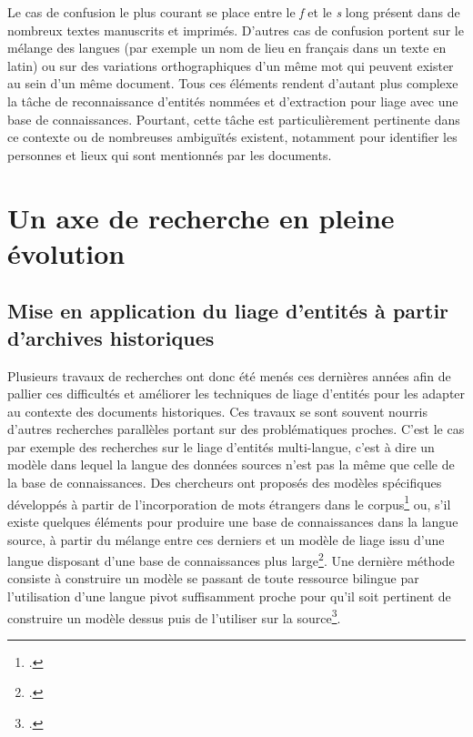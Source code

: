 \documentclass[a4paper,12pt,twoside]{book}
\begin{document}
	Le cas de confusion le plus courant se place entre le \textit{f} et le \textit{s} long présent dans de nombreux textes manuscrits et imprimés. D'autres cas de confusion portent sur le mélange des langues (par exemple un nom de lieu en français dans un texte en latin) ou sur des variations orthographiques d'un même mot qui peuvent exister au sein d'un même document. Tous ces éléments rendent d'autant plus complexe la tâche de reconnaissance d'entités nommées et d'extraction pour liage avec une base de connaissances. Pourtant, cette tâche est particulièrement pertinente dans ce contexte ou de nombreuses ambiguïtés existent, notamment pour identifier les personnes et lieux qui sont mentionnés par les documents.
	
	\section{Un axe de recherche en pleine évolution}
	
	\subsection{Mise en application du liage d'entités à partir d'archives historiques}
	
	Plusieurs travaux de recherches ont donc été menés ces dernières années afin de pallier ces difficultés et améliorer les techniques de liage d'entités pour les adapter au contexte des documents historiques. Ces travaux se sont souvent nourris d'autres recherches parallèles portant sur des problématiques proches. C'est le cas par exemple des recherches sur le liage d'entités multi-langue, c'est à dire un modèle dans lequel la langue des données sources n'est pas la même que celle de la base de connaissances. Des chercheurs ont proposés des modèles spécifiques développés à partir de l'incorporation de mots étrangers dans le corpus\footcite{linhares_pontes_linking_2020} ou, s'il existe quelques éléments pour produire une base de connaissances dans la langue source, à partir du mélange entre ces derniers et un modèle de liage issu d'une langue disposant d'une base de connaissances plus large\footcite{zhou_towards_2019}. Une dernière méthode consiste à construire un modèle se passant de toute ressource bilingue par l'utilisation d'une langue pivot suffisamment proche pour qu'il soit pertinent de construire un modèle dessus puis de l'utiliser sur la source\footcite{rijhwani_zero-shot_2019}.
	
\end{document}
